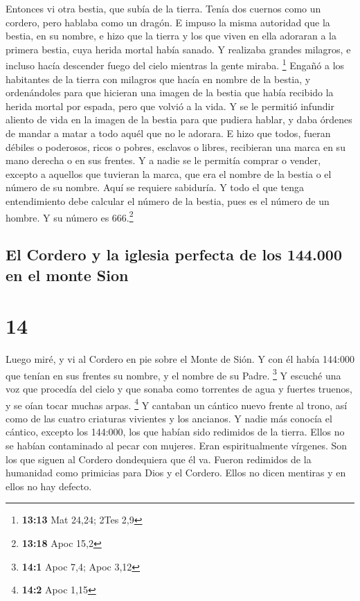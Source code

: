  Entonces vi otra bestia, que subía de la tierra. Tenía
dos cuernos como un cordero, pero hablaba como un dragón.
 E impuso la misma autoridad que la bestia, en su nombre,
e hizo que la tierra y los que viven en ella adoraran a la primera
bestia, cuya herida mortal había sanado.  Y realizaba
grandes milagros, e incluso hacía descender fuego del cielo mientras la
gente miraba. \footnote{\textbf{13:13} Mat 24,24; 2Tes 2,9}
 Engañó a los habitantes de la tierra con milagros que
hacía en nombre de la bestia, y ordenándoles para que hicieran una
imagen de la bestia que había recibido la herida mortal por espada, pero
que volvió a la vida.  Y se le permitió infundir aliento
de vida en la imagen de la bestia para que pudiera hablar, y daba
órdenes de mandar a matar a todo aquél que no le adorara.
 E hizo que todos, fueran débiles o poderosos, ricos o
pobres, esclavos o libres, recibieran una marca en su mano derecha o en
sus frentes.  Y a nadie se le permitía comprar o vender,
excepto a aquellos que tuvieran la marca, que era el nombre de la bestia
o el número de su nombre.  Aquí se requiere sabiduría. Y
todo el que tenga entendimiento debe calcular el número de la bestia,
pues es el número de un hombre. Y su número es 666.\footnote{\textbf{13:18}
  Apoc 15,2}

\hypertarget{el-cordero-y-la-iglesia-perfecta-de-los-144.000-en-el-monte-sion}{%
\subsection{El Cordero y la iglesia perfecta de los 144.000 en el monte
Sion}\label{el-cordero-y-la-iglesia-perfecta-de-los-144.000-en-el-monte-sion}}

\hypertarget{section-13}{%
\section{14}\label{section-13}}

 Luego miré, y vi al Cordero en pie sobre el Monte de
Sión. Y con él había 144:000 que tenían en sus frentes su nombre, y el
nombre de su Padre. \footnote{\textbf{14:1} Apoc 7,4; Apoc 3,12}
 Y escuché una voz que procedía del cielo y que sonaba
como torrentes de agua y fuertes truenos, y se oían tocar muchas arpas.
\footnote{\textbf{14:2} Apoc 1,15}  Y cantaban un cántico
nuevo frente al trono, así como de las cuatro criaturas vivientes y los
ancianos. Y nadie más conocía el cántico, excepto los 144:000, los que
habían sido redimidos de la tierra.  Ellos no se habían
contaminado al pecar con mujeres. Eran espiritualmente vírgenes. Son los
que siguen al Cordero dondequiera que él va. Fueron redimidos de la
humanidad como primicias para Dios y el Cordero.  Ellos no
dicen mentiras y en ellos no hay defecto.

